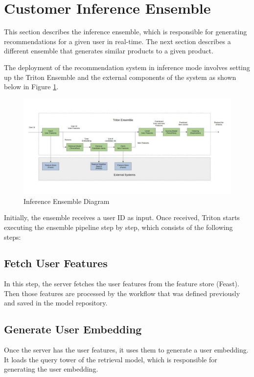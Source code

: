 \section{Customer Inference Ensemble}

This section describes the inference ensemble, which is responsible for generating recommendations for a given user in real-time.
The next section describes a different ensemble that generates similar products to a given product.

The deployment of the recommendation system in inference mode involves setting up the Triton Ensemble and the external components of the system as shown below in Figure \ref{fig: DeploymentDiagram}.

\begin{figure}[H]
    \centering
    \includegraphics[width=\textwidth]{assets/deployment.jpg}
    \caption{Inference Ensemble Diagram}
    \label{fig: DeploymentDiagram}
\end{figure}

Initially, the ensemble receives a user ID as input. Once received, Triton starts executing the ensemble pipeline step by step, which consists of the following steps:

\subsection{Fetch User Features}

In this step, the server fetches the user features from the feature store (Feast). Then those features are processed by the workflow that was defined previously and saved in the model repository.

\subsection{Generate User Embedding}

Once the server has the user features, it uses them to generate a user embedding. 
It loads the query tower of the retrieval model, which is responsible for generating the user embedding. 

